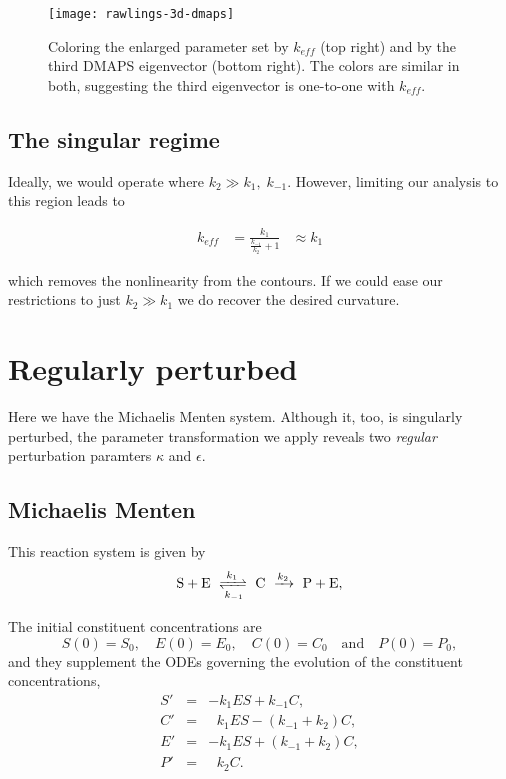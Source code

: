 \documentclass[11pt]{article}
\newcommand{\be}{\begin{equation}}
\newcommand{\ee}{\end{equation}}
\begin{document}
\begin{figure}[htbp]
  \centering
  \texttt{[image: rawlings-3d-dmaps]}
  \caption{Coloring the enlarged parameter set by $k_{eff}$ (top
    right) and by the third DMAPS eigenvector (bottom right). The
    colors are similar in both, suggesting the third eigenvector is
    one-to-one with $k_{eff}$. \label{fig:dmaps-mixed}}
\end{figure}

\subsection{The singular regime}

Ideally, we would operate where $k_2 \gg k_1, \; k_{-1}$. However,
limiting our analysis to this region leads to

\begin{align*}
  k_{eff} &= \frac{k_1}{\frac{k_{-1}}{k_2} + 1}
  & \approx k_1
\end{align*}

which removes the nonlinearity from the contours. If we could ease our
restrictions to just $k_2 \gg k_1$ we do recover the desired curvature.


\section{Regularly perturbed}

Here we have the Michaelis Menten system. Although it, too, is singularly perturbed, the parameter transformation we apply reveals two \textit{regular} perturbation paramters $\kappa$ and $\epsilon$.

\subsection{Michaelis Menten}

This reaction system is given by
%
\[
 {\rm S + E}
\
 \xrightleftharpoons[k_{-1}]{k_1}
\
 {\rm C}
\
 \xrightarrow{k_2}
\
 {\rm P + E} ,
\label{s2c2p}
\]
%

The initial constituent concentrations are
%
\be
 S(0) = S_0 ,
\quad
 E(0) = E_0 ,
\quad
 C(0) = C_0
\quad\mbox{and}\quad
 P(0) = P_0 ,
\label{SCEP-IC}
\ee
%
and they supplement the ODEs governing the evolution
of the constituent concentrations,
%
\be
\begin{array}{rclcl}
 S' &=& -k_1 E S + k_{-1} C ,
\\
 C' &=& \ \ \, k_1 E S - (k_{-1} + k_2) C ,
\\
 E' &=& -k_1 E S + (k_{-1} + k_2) C ,
\\
 P' &=& \ \ \, k_2 C .
\end{array}
\ee
\end{document}
